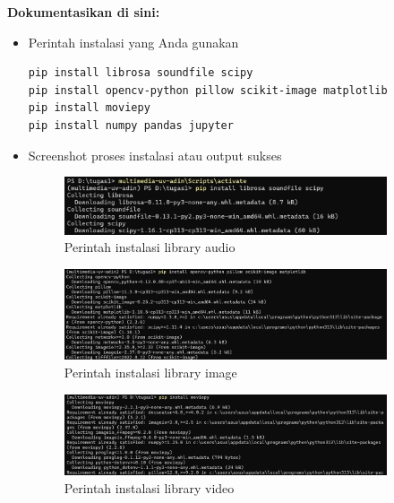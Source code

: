 \documentclass[11pt,a4paper]{article}
\begin{document}
\clearpage
\textbf{Dokumentasikan di sini:}

\begin{itemize}
    \item Perintah instalasi yang Anda gunakan
    \begin{lstlisting}
pip install librosa soundfile scipy
pip install opencv-python pillow scikit-image matplotlib
pip install moviepy
pip install numpy pandas jupyter\end{lstlisting}
    \item Screenshot proses instalasi atau output sukses  
        \begin{figure}[H]
            \centering
            \includegraphics[width=0.9\textwidth]{image/audio-dl.png}
            \caption{Perintah instalasi library audio}
            \label{fig:audio-dl}
        \end{figure}

        \begin{figure}[H]
            \centering
            \includegraphics[width=0.9\textwidth]{image/image-dl.png}
            \caption{Perintah instalasi library image}
            \label{fig:image-dl}
        \end{figure}

        \begin{figure}[H]
            \centering
            \includegraphics[width=0.9\textwidth]{image/video-dl.png}
            \caption{Perintah instalasi library video}
            \label{fig:video-dl}
        \end{figure}
    

\end{itemize}
\end{document}
